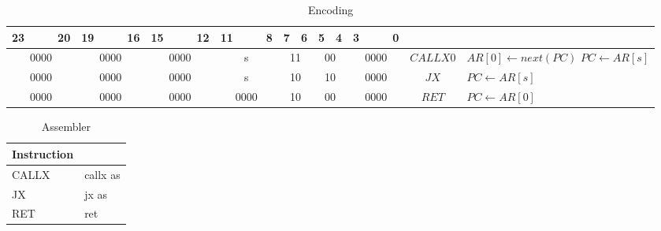 	\begin{longtable}{llllllllllllllllllllllll  p{1cm}  p{6cm} | }
		\caption{Encoding\label{long}}\\
		23 & & & 20 & 19 & & & 16 & 15 & & & 12 & 11 & & & 8 & 7 & 6 & 5 & 4 & 3 & & & 0 & & \multicolumn{1}{c}{}\\
		\hline
		\multicolumn{4}{|c|}{0000} & \multicolumn{4}{c|}{0000} & \multicolumn{4}{c|}{0000} & \multicolumn{4}{c|}{s} & \multicolumn{2}{c|}{11} & \multicolumn{2}{c|}{00} & \multicolumn{4}{c|}{0000} & \multicolumn{1}{c|}{$CALLX0$} & $AR[0] \leftarrow next(PC)$ \newline $PC \leftarrow AR[s]$\\ \hline
		\multicolumn{4}{|c|}{0000} & \multicolumn{4}{c|}{0000} & \multicolumn{4}{c|}{0000} & \multicolumn{4}{c|}{s} & \multicolumn{2}{c|}{10} & \multicolumn{2}{c|}{10} & \multicolumn{4}{c|}{0000} & \multicolumn{1}{c|}{$JX$} & $PC \leftarrow AR[s]$\\ \hline
		\multicolumn{4}{|c|}{0000} & \multicolumn{4}{c|}{0000} & \multicolumn{4}{c|}{0000} & \multicolumn{4}{c|}{0000} & \multicolumn{2}{c|}{10} & \multicolumn{2}{c|}{00} & \multicolumn{4}{c|}{0000} & \multicolumn{1}{c|}{$RET$} & $PC \leftarrow AR[0]$\\ \hline
	\end{longtable}

	\begin{longtable}{|p{5cm}|p{5cm}|}
		\caption{Assembler\label{long}}\\
		\hline
		Instruction & \\
		\hline
		CALLX & callx as\\ \hline
		JX & jx as\\ \hline
		RET & ret \\ \hline
	\end{longtable}
